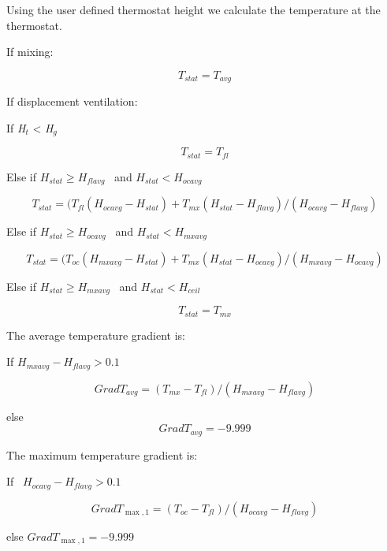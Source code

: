 Using the user defined thermostat height we calculate the temperature at the thermostat.

If mixing:

\begin{equation}
{T_{stat}} = {T_{avg}}
\end{equation}

If displacement ventilation:

If \emph{H\(_{t}\)} \textless{} \emph{H\(_{g}\)}

\begin{equation}
{T_{stat}} = {T_{fl}}
\end{equation}

Else if \({H_{stat}} \ge {H_{flavg}}\) ~and \({H_{stat}} < {H_{ocavg}}\)

\begin{equation}
{T_{stat}} = ({T_{fl}}({H_{ocavg}} - {H_{stat}}) + {T_{mx}}({H_{stat}} - {H_{flavg}})/({H_{ocavg}} - {H_{flavg}})
\end{equation}

Else if \({H_{stat}} \ge {H_{ocavg}}\) ~and \({H_{stat}} < {H_{mxavg}}\)

\begin{equation}
{T_{stat}} = ({T_{oc}}({H_{mxavg}} - {H_{stat}}) + {T_{mx}}({H_{stat}} - {H_{ocavg}})/({H_{mxavg}} - {H_{ocavg}})
\end{equation}

Else if \({H_{stat}} \ge {H_{mxavg}}\) ~and \({H_{stat}} < {H_{ceil}}\)

\begin{equation}
{T_{stat}} = {T_{mx}}
\end{equation}

The average temperature gradient is:

If \({H_{mxavg}} - {H_{flavg}} > 0.1\)

\begin{equation}
Grad{T_{avg}} = ({T_{mx}} - {T_{fl}})/({H_{mxavg}} - {H_{flavg}})
\end{equation}

else \[Grad{T_{avg}} =  - 9.999\]

The maximum temperature gradient is:

If~ \({H_{ocavg}} - {H_{flavg}} > 0.1\)

\begin{equation}
Grad{T_{\max ,1}} = ({T_{oc}} - {T_{fl}})/({H_{ocavg}} - {H_{flavg}})
\end{equation}

else \(Grad{T_{\max ,1}} = - 9.999\)

